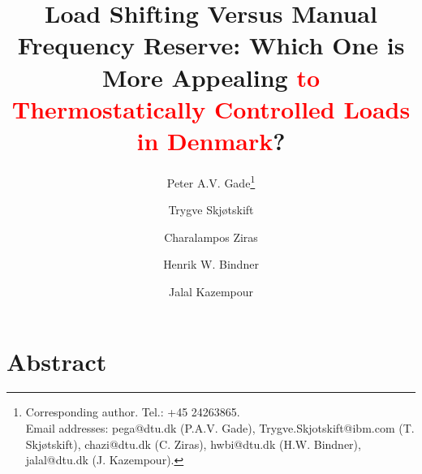 \documentclass[11pt,a4paper]{article}
\date{}
\begin{document}
\title{
    Load Shifting Versus Manual Frequency Reserve:  Which One is More Appealing \textcolor{red}{to Thermostatically Controlled Loads in Denmark}?
}
\author[1,2]{Peter A.V. Gade\footnote{Corresponding author. Tel.: +45 24263865. \\ Email addresses: pega@dtu.dk (P.A.V. Gade), Trygve.Skjotskift@ibm.com (T. Skjøtskift), chazi@dtu.dk (C. Ziras), hwbi@dtu.dk (H.W. Bindner), jalal@dtu.dk (J. Kazempour).}}
\author[2]{Trygve Skjøtskift}
\author[1]{Charalampos Ziras}
\author[1]{Henrik W. Bindner}
\author[1]{Jalal Kazempour}
\renewcommand\Affilfont{\itshape\small}

{\let\newpage\relax\maketitle}


\section*{Abstract}
\end{document}
